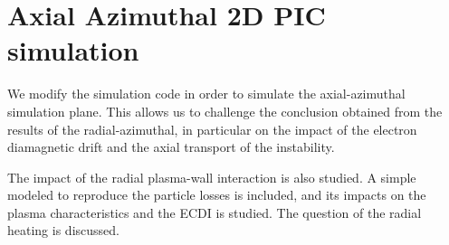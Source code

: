 



\chapter{Axial Azimuthal 2D PIC simulation}
\label{ch-6}


\begin{Chabstract}
  We modify the simulation code \LPPic in order to simulate the axial-azimuthal simulation plane.
  This allows us to challenge the conclusion obtained from the results of the radial-azimuthal, in particular on the impact of the electron diamagnetic drift and the axial transport of the instability.
  
  The impact of the radial plasma-wall interaction is also studied.
  A simple modeled to reproduce the particle losses is included, and its impacts on the plasma characteristics and the \ac{ECDI} is studied.
   The question of the radial heating is discussed. 
\end{Chabstract}
\renewcommand\subfigurewidth{3in}

% 
% 

\minitoc








